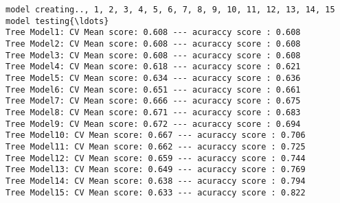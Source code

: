 \documentclass[11pt]{article}
\begin{document}
    \begin{Verbatim}[commandchars=\\\{\}]
model creating.., 1, 2, 3, 4, 5, 6, 7, 8, 9, 10, 11, 12, 13, 14, 15
model testing{\ldots}
Tree Model1: CV Mean score: 0.608 --- acuraccy score : 0.608
Tree Model2: CV Mean score: 0.608 --- acuraccy score : 0.608
Tree Model3: CV Mean score: 0.608 --- acuraccy score : 0.608
Tree Model4: CV Mean score: 0.618 --- acuraccy score : 0.621
Tree Model5: CV Mean score: 0.634 --- acuraccy score : 0.636
Tree Model6: CV Mean score: 0.651 --- acuraccy score : 0.661
Tree Model7: CV Mean score: 0.666 --- acuraccy score : 0.675
Tree Model8: CV Mean score: 0.671 --- acuraccy score : 0.683
Tree Model9: CV Mean score: 0.672 --- acuraccy score : 0.694
Tree Model10: CV Mean score: 0.667 --- acuraccy score : 0.706
Tree Model11: CV Mean score: 0.662 --- acuraccy score : 0.725
Tree Model12: CV Mean score: 0.659 --- acuraccy score : 0.744
Tree Model13: CV Mean score: 0.649 --- acuraccy score : 0.769
Tree Model14: CV Mean score: 0.638 --- acuraccy score : 0.794
Tree Model15: CV Mean score: 0.633 --- acuraccy score : 0.822

    \end{Verbatim}

    \begin{center}
    \end{center}
    { \hspace*{\fill} \\}
    
\end{document}

